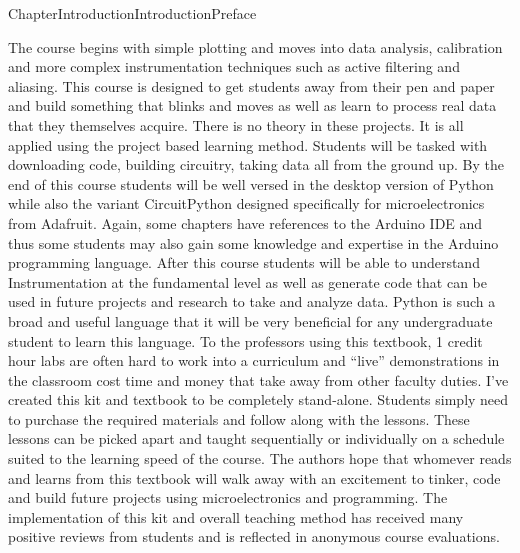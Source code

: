 \documentclass[oneside,10pt,]{book}
\numberwithin{equation}{section}
\begin{document}
\begin{chapterptx}{Chapter}{Introduction}{}{Introduction}{}{}{Preface}
\begin{introduction}{}
The course begins with simple plotting and moves into data analysis, calibration and more complex instrumentation techniques such as active filtering and aliasing. This course is designed to get students away from their pen and paper and build something that blinks and moves as well as learn to process real data that they themselves acquire. There is no theory in these projects. It is all applied using the project based learning method. Students will be tasked with downloading code, building circuitry, taking data all from the ground up. By the end of this course students will be well versed in the desktop version of Python while also the variant CircuitPython designed specifically for microelectronics from Adafruit. Again, some chapters have references to the Arduino IDE and thus some students may also gain some knowledge and expertise in the Arduino programming language. After this course students will be able to understand Instrumentation at the fundamental level as well as generate code that can be used in future projects and research to take and analyze data. Python is such a broad and useful language that it will be very beneficial for any undergraduate student to learn this language. To the professors using this textbook, 1 credit hour labs are often hard to work into a curriculum and \textquotedblleft{}live\textquotedblright{} demonstrations in the classroom cost time and money that take away from other faculty duties. I've created this kit and textbook to be completely stand-alone. Students simply need to purchase the required materials and follow along with the lessons. These lessons can be picked apart and taught sequentially or individually on a schedule suited to the learning speed of the course. The authors hope that whomever reads and learns from this textbook will walk away with an excitement to tinker, code and build future projects using microelectronics and programming. The implementation of this kit and overall teaching method has received many positive reviews from students and is reflected in anonymous course evaluations.%
\par

\end{introduction}
\end{chapterptx}
\end{document}
